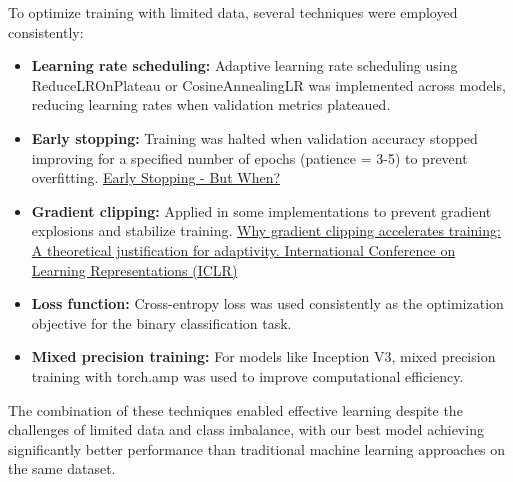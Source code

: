 \documentclass[a4paper,12pt]{article}
\begin{document}
To optimize training with limited data, several techniques were employed consistently:

\begin{itemize}
    \item \textbf{Learning rate scheduling:} Adaptive learning rate scheduling using ReduceLROnPlateau or CosineAnnealingLR was implemented across models, reducing learning rates when validation metrics plateaued.
    \item \textbf{Early stopping:} Training was halted when validation accuracy stopped improving for a specified number of epochs (patience = 3-5) to prevent overfitting. \href{https://link.springer.com/chapter/10.1007/3-540-49430-8_3}{Early Stopping - But When?} 
    \item \textbf{Gradient clipping:} Applied in some implementations to prevent gradient explosions and stabilize training. \href{Zhang, J., He, T., Sra, S., & Jadbabaie, A. (2020). Why gradient clipping accelerates training: A theoretical justification for adaptivity. International Conference on Learning Representations (ICLR).}{Why gradient clipping accelerates training: A theoretical justification for adaptivity. International Conference on Learning Representations (ICLR)}
    \item \textbf{Loss function:} Cross-entropy loss was used consistently as the optimization objective for the binary classification task.
    \item \textbf{Mixed precision training:} For models like Inception V3, mixed precision training with torch.amp was used to improve computational efficiency.
\end{itemize}

The combination of these techniques enabled effective learning despite the challenges of limited data and class imbalance, with our best model achieving significantly better performance than traditional machine learning approaches on the same dataset.
\end{document}
